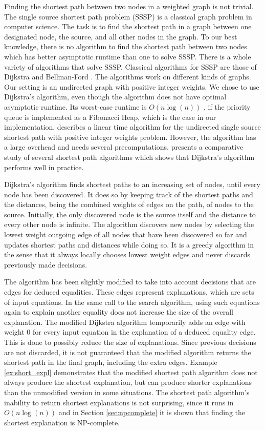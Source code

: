 Finding the shortest path between two nodes in a weighted graph is not trivial.
The single source shortest path problem (SSSP) is a classical graph problem in computer science.
The task is to find the shortest path in a graph between one designated node, the source, and all other nodes in the graph.
To our best knowledge, there is no algorithm to find the shortest path between two nodes which has better asymptotic runtime than one to solve SSSP.
There is a whole variety of algorithms that solve SSSP.
Classical algorithms for SSSP are those of Dijkstra \cite{Dijkstra1959} and Bellman-Ford \cite{Ford1956,Bellman1956}.
The algorithms work on different kinds of graphs.
Our setting is an undirected graph with positive integer weights.
We chose to use Dijkstra's algorithm, even though the algorithm does not have optimal asymptotic runtime.
Its worst-case runtime is $O(n \log(n))$ \cite{Cormen1989}, if the priority queue is implemented as a Fibonacci Heap, which is the case in our implementation.
\cite{Thorup1999} describes a linear time algorithm for the undirected single source shortest path with positive integer weights problem.
However, the algorithm has a large overhead and needs several precomputations.
\cite{Cherkassky1996} presents a comparative study of several shortest path algorithms which shows that Dijkstra's algorithm performs well in practice.

Dijkstra's algorithm finds shortest paths to an increasing set of nodes, until every node has been discovered.
It does so by keeping track of the shortest paths and the distances, being the combined weights of edges on the path, of nodes to the source.
Initially, the only discovered node is the source itself and the distance to every other node is infinite.
The algorithm discovers new nodes by selecting the lowest weight outgoing edge of all nodes that have been discovered so far and updates shortest paths and distances while doing so.
It is a greedy algorithm in the sense that it always locally chooses lowest weight edges and never discards previously made decisions.

The algorithm has been slightly modified to take into account decisions that are edges for deduced equalities.
These edges represent explanations, which are sets of input equations.
In the same call to the search algorithm, using such equations again to explain another equality does not increase the size of the overall explanation.
The modified Dijkstra algorithm temporarily adds an edge with weight 0 for every input equation in the explanation of a deduced equality edge.
This is done to possibly reduce the size of explanations.
Since previous decisions are not discarded, it is not guaranteed that the modified algorithm returns the shortest path in the final graph, including the extra edges.
Example \ref{ex:short_expl} demonstrates that the modified shortest path algorithm does not always produce the shortest explanation, but can produce shorter explanations than the unmodified version in some situations.
The shortest path algorithm's inability to return shortest explanations is not surprising, since it runs in $O(n \log(n))$ and in Section \ref{sec:npcomplete} it is shown that finding the shortest explanation is NP-complete.

